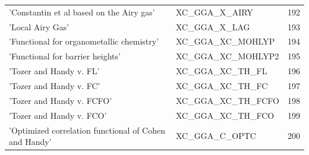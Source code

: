 \documentclass[final,12pt]{article}
\begin{document}
{{{{{{\begin{table}[!h]
\begin{center}
\begin{tabular}{llr}
  'Constantin et al based on the Airy gas' & XC\_GGA\_X\_AIRY  &192\\
  'Local Airy Gas' & XC\_GGA\_X\_LAG  &193\\
  'Functional for organometallic chemistry' & XC\_GGA\_XC\_MOHLYP  &194\\
  'Functional for barrier heights' & XC\_GGA\_XC\_MOHLYP2  &195\\
  'Tozer and Handy v. FL' & XC\_GGA\_XC\_TH\_FL  &196\\
  'Tozer and Handy v. FC' & XC\_GGA\_XC\_TH\_FC  &197\\
  'Tozer and Handy v. FCFO' & XC\_GGA\_XC\_TH\_FCFO  &198\\
  'Tozer and Handy v. FCO' & XC\_GGA\_XC\_TH\_FCO  &199\\
  'Optimized correlation functional of Cohen and Handy' & XC\_GGA\_C\_OPTC  &200\\
\hline
\hline
\end{tabular}
\end{center}
\end{table}

}}}}}}
\end{document}
